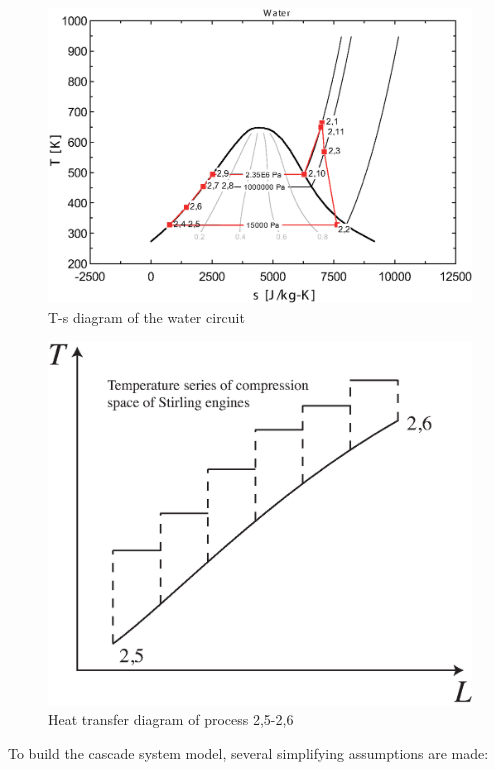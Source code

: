 \documentclass{article}
\begin{document}
\noindent \begin{figure}[htbp]
\begin{center}
	\includegraphics[width = 0.7\columnwidth]{./graphics/T-s_Water}
	\caption{T-s diagram of the water circuit}
	\label{fig:T-s_Water}
\end{center}
\end{figure}

\noindent \begin{figure}[htbp]
\begin{center}
	\includegraphics[width = 0.7\columnwidth]{./graphics/HeatTransfer_Water-SEs}
	\caption{Heat transfer diagram of process 2,5-2,6}
	\label{fig:HeatTransfer_Water-SEs}
\end{center}
\end{figure}

To build the cascade system model, several simplifying assumptions are made:
\end{document}
